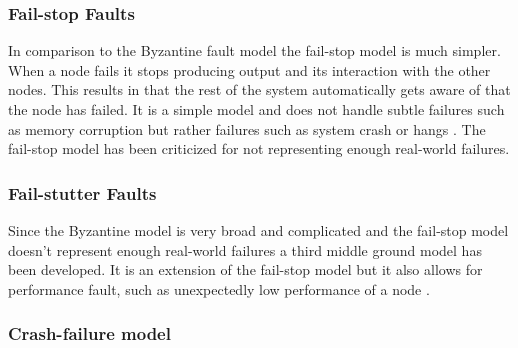 \documentclass{cslthse-msc}
\begin{document}

\subsubsection*{Fail-stop Faults}
In comparison to the Byzantine fault model the fail-stop model is much simpler. When a node fails it stops producing output and its interaction with the other nodes. This results in that the rest of the system automatically gets aware of that the node has failed. It is a simple model and does not handle subtle failures such as memory corruption but rather failures such as system crash or hangs \cite{surveyFaultParallel}. The fail-stop model has been criticized for not representing enough real-world failures.



\subsubsection*{Fail-stutter Faults}
Since the Byzantine model is very broad and complicated and the fail-stop model doesn't represent enough real-world failures a third middle ground model has been developed. It is an extension of the fail-stop model but it also allows for performance fault, such as unexpectedly low performance of a node \cite{surveyFaultParallel}.

\subsubsection*{Crash-failure model}

\end{document}
